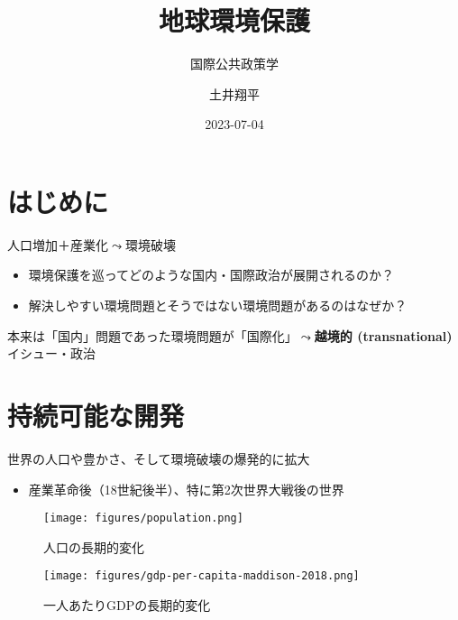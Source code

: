 \documentclass[
  xelatex,
  ja=standard]{bxjsarticle}
\title{地球環境保護}
\subtitle{国際公共政策学}
\author{土井翔平}
\date{2023-07-04}
\providecommand{\tightlist}{%
  \setlength{\itemsep}{0pt}\setlength{\parskip}{0pt}}\usepackage{longtable,booktabs,array}
\begin{document}
\maketitle
\ifdefined\Shaded\renewenvironment{Shaded}{\begin{tcolorbox}[interior hidden, borderline west={3pt}{0pt}{shadecolor}, sharp corners, enhanced, boxrule=0pt, frame hidden, breakable]}{\end{tcolorbox}}\fi

\hypertarget{ux306fux3058ux3081ux306b}{%
\section*{はじめに}\label{ux306fux3058ux3081ux306b}}

人口増加＋産業化\(\leadsto\)環境破壊

\begin{itemize}
\tightlist
\item
  環境保護を巡ってどのような国内・国際政治が展開されるのか？
\item
  解決しやすい環境問題とそうではない環境問題があるのはなぜか？
\end{itemize}

本来は「国内」問題であった環境問題が「国際化」\(\leadsto\)\textbf{越境的
(transnational)} イシュー・政治

\hypertarget{ux6301ux7d9aux53efux80fdux306aux958bux767a}{%
\section{持続可能な開発}\label{ux6301ux7d9aux53efux80fdux306aux958bux767a}}

世界の人口や豊かさ、そして環境破壊の爆発的に拡大

\begin{itemize}
\tightlist
\item
  産業革命後（18世紀後半）、特に第2次世界大戦後の世界
\end{itemize}

\begin{figure}[htpb]

{\centering \texttt{[image: figures/population.png]}

}

\caption{人口の長期的変化}

\end{figure}

\begin{figure}[htpb]

{\centering \texttt{[image: figures/gdp-per-capita-maddison-2018.png]}

}

\caption{一人あたりGDPの長期的変化}

\end{figure}
\end{document}
